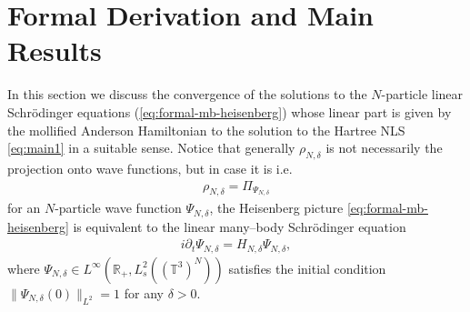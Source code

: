 \section{Formal Derivation and Main Results}\label{sec:ANLS-derivation}

In this section we discuss the convergence of the solutions to the
$N$-particle linear Schr{\"o}dinger equations (\ref{eq:formal-mb-heisenberg})
whose linear part is given by the mollified Anderson Hamiltonian to the
solution to the Hartree NLS \eqref{eq:main1} in a suitable sense. Notice that generally $\rho_{N, \delta}$ is not necessarily the projection onto wave
functions, but in case it is i.e.
\begin{align}\label{eq:pure-state-many-body}
\rho_{N, \delta} = \Pi_{\Psi_{N, \delta}} 
\end{align}
for an $N$-particle wave function $\Psi_{N, \delta}$, the Heisenberg picture \eqref{eq:formal-mb-heisenberg} is equivalent to the linear many--body
Schr{\"o}dinger equation
\begin{align}\label{eq:Schroedinger-many-body}
  i \partial_t \Psi_{N, \delta} = H_{N, \delta} \Psi_{N, \delta},
\end{align}
where $\Psi_{N, \delta} \in L^{\infty} (\mathbb{R}_+, L^2_s
((\mathbb{T}^3)^N))$ satisfies the initial condition $\| \Psi_{N, \delta} (0) \|_{L^2} =
1$ for any $\delta > 0$.\\

